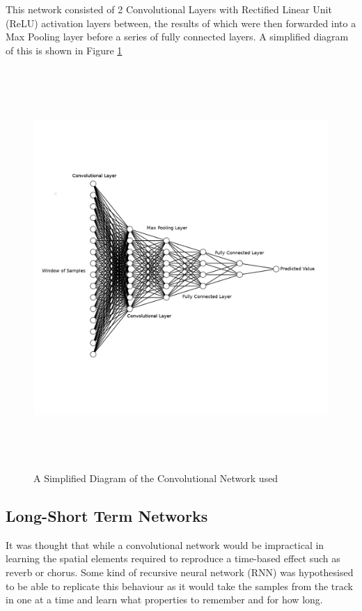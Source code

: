 \documentclass{l4proj}
\begin{document}
This network consisted of 2 Convolutional Layers with Rectified Linear
Unit (ReLU) activation layers between, the results of which were then
forwarded into a Max Pooling layer before a series of fully connected
layers. A simplified diagram of this is shown in Figure \ref{fig:nn}

\begin{figure}
\centering
\includegraphics[height=6.00000in]{images/cnn.png}
\caption{A Simplified Diagram of the Convolutional Network
used\label{fig:nn}}
\end{figure}

\subsection{Long-Short Term Networks}\label{long-short-term-networks}

It was thought that while a convolutional network would be impractical
in learning the spatial elements required to reproduce a time-based
effect such as reverb or chorus. Some kind of recursive neural network
(RNN) was hypothesised to be able to replicate this behaviour as it
would take the samples from the track in one at a time and learn what
properties to remember and for how long.
\end{document}
